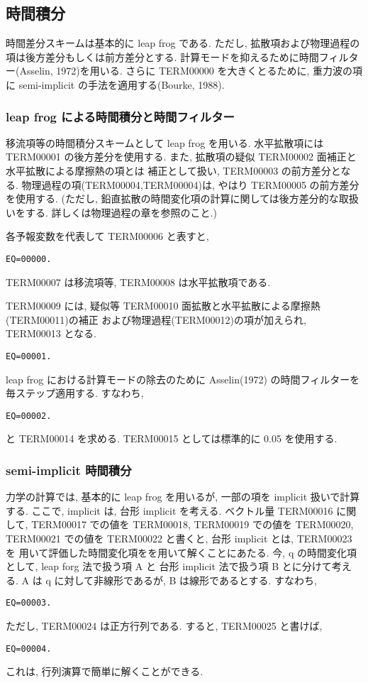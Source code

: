 ﻿\subsection{時間積分}

時間差分スキームは基本的に leap frog である.
ただし, 拡散項および物理過程の項は後方差分もしくは前方差分とする.
計算モードを抑えるために時間フィルター(Asselin, 1972)を用いる.
さらに TERM00000 を大きくとるために,
重力波の項に semi-implicit の手法を適用する(Bourke, 1988).

\subsubsection{leap frog による時間積分と時間フィルター}

移流項等の時間積分スキームとして leap frog を用いる.
水平拡散項には TERM00001 の後方差分を使用する.
また, 拡散項の疑似 TERM00002 面補正と水平拡散による摩擦熱の項とは
補正として扱い, TERM00003 の前方差分となる.
物理過程の項(TERM00004,TERM00004)は,
やはり TERM00005 の前方差分を使用する.
(ただし, 鉛直拡散の時間変化項の計算に関しては後方差分的な取扱いをする.
詳しくは物理過程の章を参照のこと.)

各予報変数を代表して TERM00006 と表すと,
%
\begin{verbatim}
EQ=00000.
\end{verbatim}
%
TERM00007 は移流項等,
TERM00008 は水平拡散項である.

TERM00009 には, 
疑似等 TERM00010 面拡散と水平拡散による摩擦熱(TERM00011)の補正
および物理過程(TERM00012)の項が加えられ,
TERM00013 となる.
%
\begin{verbatim}
EQ=00001.
\end{verbatim}

leap frog における計算モードの除去のために 
Asselin(1972) の時間フィルターを毎ステップ適用する.
すなわち, 
%
\begin{verbatim}
EQ=00002.
\end{verbatim}
%
と TERM00014 を求める.
TERM00015 としては標準的に 0.05 を使用する. 

\subsubsection{semi-implicit 時間積分}

力学の計算では, 基本的に leap frog を用いるが,
一部の項を implicit 扱いで計算する.
ここで, implicit は, 台形 implicit を考える.
ベクトル量 TERM00016 に関して,
TERM00017 での値を TERM00018,
TERM00019 での値を TERM00020,
TERM00021 での値を TERM00022 と書くと,
台形 implicit とは,
TERM00023 を
用いて評価した時間変化項をを用いて解くことにあたる.
%
今, {\boldmath q} の時間変化項として,
leap forg 法で扱う項 A と 台形 implicit 法で扱う項 B とに分けて考える.
A は {\boldmath q} に対して非線形であるが, B は線形であるとする.
すなわち,
%
\begin{verbatim}
EQ=00003.
\end{verbatim}
%
ただし, TERM00024 は正方行列である. すると,
TERM00025
と書けば,
\begin{verbatim}
EQ=00004.
\end{verbatim}
%
これは, 行列演算で簡単に解くことができる.

